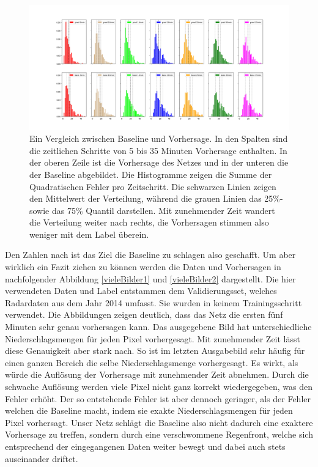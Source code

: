 \begin{figure}[h]
	\includegraphics[width=\linewidth]{pics/35min_vgl_baseline}
	\caption[Vergleich zwischen Baseline und UNet (35 Minuten Vorhersage)]{Ein Vergleich zwischen Baseline und Vorhersage. In den Spalten sind die zeitlichen Schritte von 5 bis 35 Minuten Vorhersage enthalten. In der oberen Zeile ist die Vorhersage des Netzes und in der unteren die der Baseline abgebildet. Die Histogramme zeigen die Summe der Quadratischen Fehler pro Zeitschritt. Die schwarzen Linien zeigen den Mittelwert der Verteilung, während die grauen Linien das 25\%- sowie das 75\% Quantil darstellen. Mit zunehmender Zeit wandert die Verteilung weiter nach rechts, die Vorhersagen stimmen also weniger mit dem Label überein.}
	\label{35vglbasepred}
\end{figure}

Den Zahlen nach ist das Ziel die Baseline zu schlagen also geschafft. Um aber wirklich ein Fazit ziehen zu können werden die Daten und Vorhersagen in nachfolgender Abbildung \ref{vieleBilder1} und \ref{vieleBilder2} dargestellt.
Die hier verwendeten Daten und Label entstammen dem Validierungsset, welches Radardaten aus dem Jahr 2014 umfasst. Sie wurden in keinem Trainingsschritt verwendet.
Die Abbildungen zeigen deutlich, dass das Netz die ersten fünf Minuten sehr genau vorhersagen kann. Das ausgegebene Bild hat unterschiedliche Niederschlagsmengen für jeden Pixel vorhergesagt. Mit zunehmender Zeit lässt diese Genauigkeit aber stark nach. So ist im letzten Ausgabebild sehr häufig für einen ganzen Bereich die selbe Niederschlagsmenge vorhergesagt. Es wirkt, als würde die Auflösung der Vorhersage mit zunehmender Zeit abnehmen. Durch die schwache Auflösung werden viele Pixel nicht ganz korrekt wiedergegeben, was den Fehler erhöht. Der so entstehende Fehler ist aber dennoch geringer, als der Fehler welchen die Baseline macht, indem sie exakte Niederschlagsmengen für jeden Pixel vorhersagt. Unser Netz schlägt die Baseline also nicht dadurch eine exaktere Vorhersage zu treffen, sondern durch eine verschwommene Regenfront, welche sich entsprechend der eingegangenen Daten weiter bewegt und dabei auch stets auseinander driftet.



